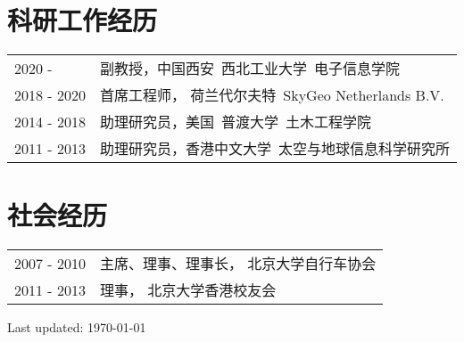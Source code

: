 \documentclass[letterpaper]{article}
\def\footerlink{}
\begin{document}

\section*{\textsc{科研工作经历}}
\begin{tabular}{ll}
2020 -      & 副教授，中国西安\ 西北工业大学\ 电子信息学院  \vspace{.5em}\\
2018 - 2020 & 首席工程师， 荷兰代尔夫特\ SkyGeo Netherlands B.V. \vspace{.5em}\\
2014 - 2018 & 助理研究员，美国\ 普渡大学\ 土木工程学院 \vspace{.5em}\\
2011 - 2013 & 助理研究员，香港中文大学\ 太空与地球信息科学研究所
\end{tabular}

\section*{\textsc{社会经历}}
\begin{tabular}{ll}
2007 - 2010     & 主席、理事、理事长， 北京大学自行车协会\vspace{.5em}\\
2011 - 2013     & 理事， 北京大学香港校友会\\
\end{tabular}


\makeatletter \renewcommand\@biblabel[1]{[#1]} \makeatother



\begin{center}
  \begin{footnotesize}
    Last updated: \today \\
  \end{footnotesize}
\end{center}
\end{document}
